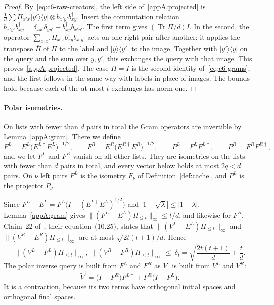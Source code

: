 \documentclass[11pt,letterpaper]{article}
\theoremstyle{definition}\newtheorem{definition}[theorem]{Definition}
\newcommand{\Tr}{\operatorname{Tr}}
\newcommand{\ket}[1]{\lvert#1\rangle}
\newcommand{\bra}[1]{\langle#1\rvert}
\newcommand{\norm}[1]{\lVert#1\rVert}
\begin{document}
\begin{proof}
By~\eqref{eq:c6-raw-creators}, the left side of~\eqref{appA:projected}
is $\frac1d\sum\Pi_{x'x}\ket{y'}\bra y\otimes b_{x'y'}b^\dagger_{xy}$.
Insert the commutation relation
$b_{x'y'}b^\dagger_{xy}=\delta_{xx'}\delta_{yy'}+b^\dagger_{xy}b_{x'y'}$.
The first term gives $(\Tr\Pi/d)I$. In the second, the operator
$\sum_{x,x'}\Pi_{x'x}b^\dagger_{xy}b_{x'y'}$ acts on one right pair
after another: it applies the transpose $\overline\Pi$ of $\Pi$ to the
label and $\ket y\bra{y'}$ to the image. Together with $\ket{y'}\bra y$
on the query and the sum over $y,y'$, this exchanges the query with
that image. This proves~\eqref{appA:projected}. The case $\Pi=I$ is
the second identity of~\eqref{eq:c6-grams}, and the first follows in
the same way with labels in place of images. The bounds hold because
each of the at most $t$ exchanges has norm one.
\end{proof}

\paragraph{Polar isometries.}
On lists with fewer than $d$ pairs in total the Gram operators are
invertible by Lemma~\ref{appA:gram}. There we define
\[
 F^L=E^L\bigl(E^{L\dagger}E^L\bigr)^{-1/2},\qquad
 F^R=E^R\bigl(E^{R\dagger}E^R\bigr)^{-1/2},\qquad
 P^L=F^LF^{L\dagger},\qquad P^R=F^RF^{R\dagger},
\]
and we let $F^L$ and $F^R$ vanish on all other lists. They are
isometries on the lists with fewer than $d$ pairs in total, and every
vector below holds at most $2q<d$ pairs. On $\nu$ left pairs $F^L$ is
the isometry $F_\nu$ of Definition~\ref{def:cache}, and $P^L$ is the
projector $P_\nu$.

Since
$F^L-E^L=F^L\bigl(I-(E^{L\dagger}E^L)^{1/2}\bigr)$ and
$|1-\sqrt\lambda|\le|1-\lambda|$, Lemma~\ref{appA:gram} gives
$\norm{(F^L-E^L)\Pi_{\le t}}_\infty\le t/d$, and likewise for $F^R$.
Claim~22 of~\cite{mahuang2025}, their equation~(10.25), states that
$\norm{(V^L-E^L)\Pi_{\le t}}_\infty$ and
$\norm{(V^R-E^R)\Pi_{\le t}}_\infty$ are at most $\sqrt{2t(t+1)/d}$.
Hence
\begin{equation}\label{eq:c6-delta}
 \norm{(V^L-F^L)\Pi_{\le t}}_\infty,\
 \norm{(V^R-F^R)\Pi_{\le t}}_\infty\ \le\
 \delta_t=\sqrt{\frac{2t(t+1)}d}+\frac td .
\end{equation}
The polar inverse query is built from $F^L$ and $F^R$ as $V^\dagger$
is built from $V^L$ and $V^R$:
\begin{equation}\label{eq:c6-polar-W}
 \widetilde V^\dagger=\bigl(I-P^R\bigr)F^{L\dagger}+F^R\bigl(I-P^L\bigr).
\end{equation}
It is a contraction, because its two terms have orthogonal initial
spaces and orthogonal final spaces.
\end{document}
